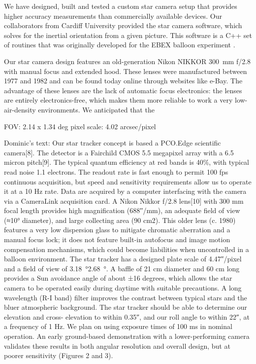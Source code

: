 We have designed, built and tested a custom star camera setup that provides higher accuracy measurements than commercially available devices. Our collaborators from Cardiff University provided the star camera software, which solves for the inertial orientation from a given picture. This software is a C++ set of routines that was originally developed for the EBEX balloon experiment \citep{Oxley:2004hl}. 

Our star camera design features an old-generation Nikon NIKKOR \SI{300}{\mm} f/2.8 with manual focus and extended hood. These lenses were manufactured between 1977 and 1982 and can be found today online through websites like e-Bay. The advantage of these lenses are the lack of automatic focus electronics: the lenses are entirely electronics-free, which makes them more reliable to work a very low-air-density environments. We anticipated that the 


FOV: 2.14 x 1.34 deg
pixel scale: 	4.02 arcsec/pixel

Dominic's text: Our star tracker concept is based a PCO.Edge scientific camera[8]. The detector is a Fairchild CMOS 5.5 megapixel array with a 6.5 micron pitch[9]. The typical quantum efficiency at red bands is 40\%, with typical read noise 1.1 electrons. The readout rate is fast enough to permit 100 fps continuous acquisition, but speed and sensitivity requirements allow us to operate it at a 10 Hz rate. Data are acquired by a computer interfacing with the camera via a CameraLink acquisition card. A Nikon Nikkor f/2.8 lens[10] with 300 mm focal length provides high magnification (688′′/mm), an adequate field of view (≈10° diameter), and large collecting area (90 cm2). This older lens (c. 1980) features a very low dispersion glass to mitigate chromatic aberration and a manual focus lock; it does not feature built-in autofocus and image motion compensation mechanisms, which could become liabilities when uncontrolled in a balloon environment.
The star tracker has a designed plate scale of \ang{;;4.47}/pixel and a field of view of \SI{3.18}{\degree}\times\SI{2.68}{\degree}. A baffle of 21 cm diameter and 60 cm long provides a Sun avoidance angle of about ±16 degrees, which allows the star camera to be operated easily during daytime with suitable precautions. A long wavelength (R-I band) filter improves the contrast between typical stars and the bluer atmospheric background. The star tracker should be able to determine our elevation and cross- elevation to within \ang{;;0.35}, and our roll angle to within \ang{;;22}, at a frequency of 1 Hz. We plan on using exposure times of 100 ms in nominal operation. An early ground-based demonstration with a lower-performing camera validates these results in both angular resolution and overall design, but at poorer sensitivity (Figures 2 and 3).

